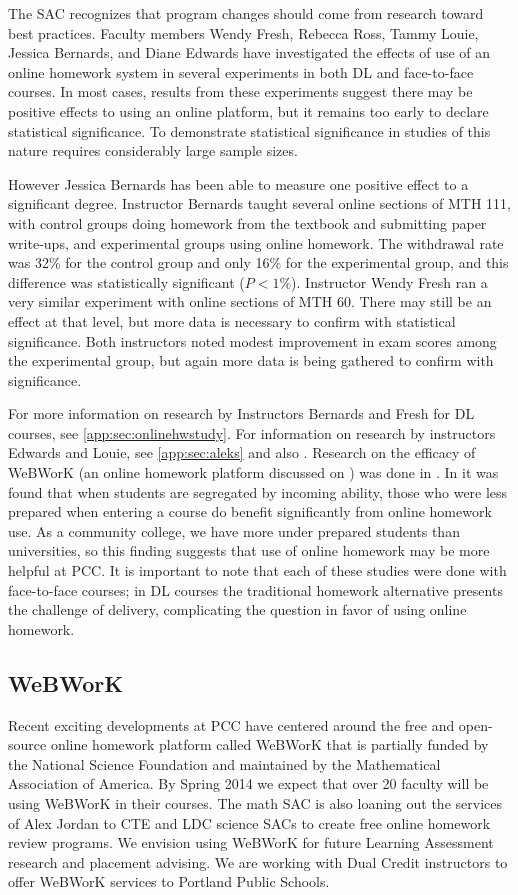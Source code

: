 The SAC recognizes that program changes should come from research toward best
practices.  Faculty members Wendy Fresh, Rebecca Ross, Tammy Louie, Jessica
Bernards, and Diane Edwards have investigated the effects of use of an online
homework system in several experiments in both DL and face-to-face courses. In most
cases, results from these experiments suggest there may be positive effects to
using an online platform, but it remains too early to declare statistical
significance. To demonstrate statistical significance in studies of this nature
requires considerably large sample sizes. 

However Jessica Bernards has been able to measure one positive effect to a
significant degree. Instructor Bernards taught several online sections of MTH
111, with control groups doing homework from the textbook and submitting paper
write-ups, and experimental groups using online homework. The withdrawal rate
was 32\% for the control group and only 16\% for the experimental group, and
this difference was statistically significant ($P<1\%$).  Instructor Wendy Fresh
ran a very similar experiment with online sections of MTH 60. There may still be
an effect at that level, but more data is necessary to confirm with statistical
significance. Both instructors noted modest improvement in exam scores among the
experimental group, but again more data is being gathered to confirm with
significance.

For more information on research by Instructors Bernards and Fresh for DL
courses, see \vref{app:sec:onlinehwstudy}. For information on research by
instructors Edwards and Louie, see \vref{app:sec:aleks} and also
. Research on the efficacy of WeBWorK (an online
homework platform discussed on ) was done in
\cite{focuswebwork}.  In \cite{brewer} it was found that when students are
segregated by incoming ability, those who were less prepared when entering a
course do benefit significantly from online homework use. As a community
college, we have more under prepared students than universities, so this
finding suggests that use of online homework may be more helpful at PCC. It is
important to note that each of these studies were done with face-to-face
courses; in DL courses the traditional homework alternative presents the
challenge of delivery, complicating the question in favor of using online
homework.

\subsection{WeBWorK}\label{other:sec:webwork}
Recent exciting developments at PCC have centered around the free and
open-source online homework platform called WeBWorK that is partially funded by
the National Science Foundation and maintained by the Mathematical Association
of America. By Spring 2014 we expect that over 20 faculty will be using WeBWorK
in their courses. The math SAC is also loaning out the services of Alex Jordan
to CTE and LDC science SACs to create free online homework review programs. We
envision using WeBWorK for future Learning Assessment research and placement
advising. We are working with Dual Credit instructors to offer WeBWorK services
to Portland Public Schools.

